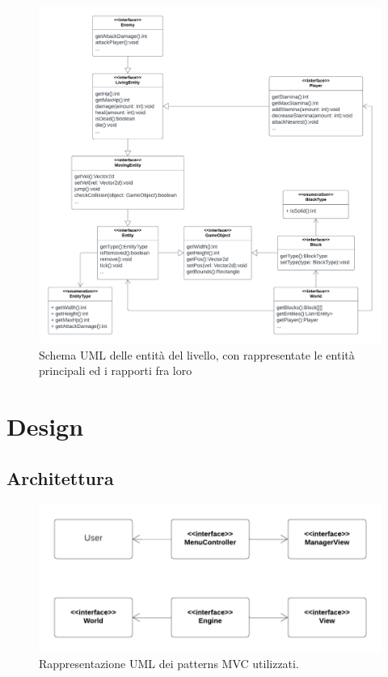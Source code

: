 \documentclass[a4paper,12pt]{report}
\begin{document}
    \begin{figure}[H]
        \centering{}
        \includegraphics[scale=0.6] {img/analisi-uml.png}
        \caption{Schema UML delle entità del livello, con rappresentate le entità principali ed i rapporti fra loro}
        \label{img:analisi-uml}
    \end{figure}

    \chapter{Design}

    \section{Architettura}

    \begin{figure}[H]
        \centering{}
        \includegraphics[scale=0.8] {img/architettura-uml.png}
        \caption{Rappresentazione UML dei patterns MVC utilizzati.}
        \label{img:users}
    \end{figure}
\end{document}
